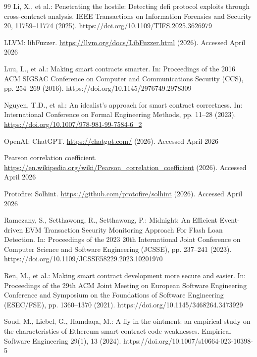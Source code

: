 \documentclass[pdflatex,sn-basic]{sn-jnl}%
\theoremstyle{thmstyleone}%
\theoremstyle{thmstyletwo}%
\theoremstyle{thmstylethree}%
\begin{document}
\begin{thebibliography}{99}
Li, X., et al.: Penetrating the hostile: Detecting defi protocol exploits through cross-contract analysis. IEEE Transactions on Information Forensics and Security 20, 11759--11774 (2025). https://doi.org/10.1109/TIFS.2025.3626979

LLVM: libFuzzer. \url{https://llvm.org/docs/LibFuzzer.html} (2026). Accessed April 2026

Luu, L., et al.: Making smart contracts smarter. In: Proceedings of the 2016 ACM SIGSAC Conference on Computer and Communications Security (CCS), pp. 254--269 (2016). https://doi.org/10.1145/2976749.2978309

Nguyen, T.D., et al.: An idealist's approach for smart contract correctness. In: International Conference on Formal Engineering Methods, pp. 11--28 (2023). \url{https://doi.org/10.1007/978-981-99-7584-6_2}

OpenAI: ChatGPT. \url{https://chatgpt.com/} (2026). Accessed April 2026

Pearson correlation coefficient. \url{https://en.wikipedia.org/wiki/Pearson_correlation_coefficient} (2026). Accessed April 2026

Protofire: Solhint. \url{https://github.com/protofire/solhint} (2026). Accessed April 2026

Ramezany, S., Setthawong, R., Setthawong, P.: Midnight: An Efficient Event-driven EVM Transaction Security Monitoring Approach For Flash Loan Detection. In: Proceedings of the 2023 20th International Joint Conference on Computer Science and Software Engineering (JCSSE), pp. 237--241 (2023). https://doi.org/10.1109/JCSSE58229.2023.10201970

Ren, M., et al.: Making smart contract development more secure and easier. In: Proceedings of the 29th ACM Joint Meeting on European Software Engineering Conference and Symposium on the Foundations of Software Engineering (ESEC/FSE), pp. 1360--1370 (2021). https://doi.org/10.1145/3468264.3473929

Soud, M., Liebel, G., Hamdaqa, M.: A fly in the ointment: an empirical study on the characteristics of Ethereum smart contract code weaknesses. Empirical Software Engineering 29(1), 13 (2024). https://doi.org/10.1007/s10664-023-10398-5


\end{thebibliography}
\end{document}
